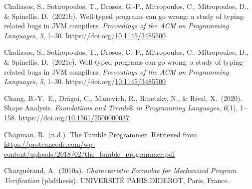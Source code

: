 \documentclass[12pt,twoside]{article}
\begin{document}
{\begin{thebibliography}{1079}
\mdbibitemlabel{}Chaliasos, S., Sotiropoulos, T., Drosos, G.-P., Mitropoulos, C., Mitropoulos, D., \& Spinellis, D.~(2021b). Well-typed programs can go wrong: a study of typing-related bugs in JVM compilers. \emph{Proceedings of the ACM on Programming Languages}, \emph{5}, 1–30. https://doi.org/\href{https://dx.doi.org/10.1145/3485500}{10.1145/3485500}%

\mdbibitemlabel{}Chaliasos, S., Sotiropoulos, T., Drosos, G.-P., Mitropoulos, C., Mitropoulos, D., \& Spinellis, D.~(2021c). Well-typed programs can go wrong: a study of typing-related bugs in JVM compilers. \emph{Proceedings of the ACM on Programming Languages}, \emph{5}, 1–30. https://doi.org/\href{https://dx.doi.org/10.1145/3485500}{10.1145/3485500}%

\mdbibitemlabel{}Chang, B.-Y.~E., Drăgoi, C., Manevich, R., Rinetzky, N., \& Rival, X.~(2020). Shape Analysis. \emph{Foundations and Trends® in Programming Languages}, \emph{6}(1), 1–158. https://doi.org/\href{https://dx.doi.org/10.1561/2500000037}{10.1561/2500000037}%

\mdbibitemlabel{}Chapman, R.~(n.d.). The Fumble Programmer. Retrieved from \href{https://proteancode.com/wp-content/uploads/2018/02/the_fumble_programmer.pdf}{{\ttfamily https://\hspace{0pt}proteancode.\hspace{0pt}com/\hspace{0pt}wp-\hspace{0pt}content/\hspace{0pt}uploads/\hspace{0pt}2018/\hspace{0pt}02/\hspace{0pt}the\_\hspace{0pt}fumble\_\hspace{0pt}programmer.\hspace{0pt}pdf}}%

\mdbibitemlabel{}Charguéraud, A.~(2010a). \emph{Characteristic Formulae for Mechanized Program Verification} (phdthesis). UNIVERSITÉ PARIS.DIDEROT, Paris, France.%


\end{thebibliography}}
\end{document}
